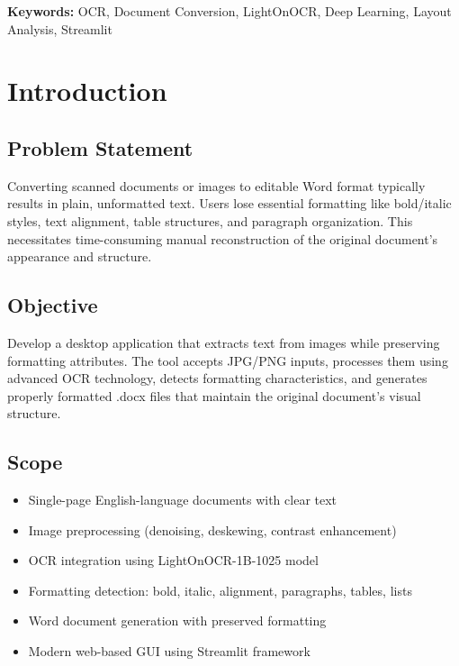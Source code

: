 \documentclass[12pt,a4paper]{article}
\begin{document}
\textbf{Keywords:} OCR, Document Conversion, LightOnOCR, Deep Learning, Layout Analysis, Streamlit

\newpage

\section{Introduction}

\subsection{Problem Statement}
Converting scanned documents or images to editable Word format typically results in plain, unformatted text. Users lose essential formatting like bold/italic styles, text alignment, table structures, and paragraph organization. This necessitates time-consuming manual reconstruction of the original document's appearance and structure.

\subsection{Objective}
Develop a desktop application that extracts text from images while preserving formatting attributes. The tool accepts JPG/PNG inputs, processes them using advanced OCR technology, detects formatting characteristics, and generates properly formatted .docx files that maintain the original document's visual structure.

\subsection{Scope}
\begin{itemize}[noitemsep]
    \item Single-page English-language documents with clear text
    \item Image preprocessing (denoising, deskewing, contrast enhancement)
    \item OCR integration using LightOnOCR-1B-1025 model
    \item Formatting detection: bold, italic, alignment, paragraphs, tables, lists
    \item Word document generation with preserved formatting
    \item Modern web-based GUI using Streamlit framework
\end{itemize}
\end{document}
